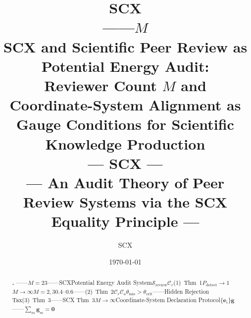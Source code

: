 \documentclass[12pt,a4paper]{article}
\title{
    \textbf{\LARGE SCX\\[6pt]
    ——$M$}\\[14pt]
    \large
    SCX and Scientific Peer Review as Potential Energy Audit:\\
    Reviewer Count $M$ and Coordinate-System Alignment as\\
    Gauge Conditions for Scientific Knowledge Production\\[8pt]
    \normalsize
    --- SCX ---\\
    --- An Audit Theory of Peer Review Systems via the SCX Equality Principle ---
}
\author{SCX}\\[4pt]
\date{\today}
\theoremstyle{remark}
\newcommand{\sumgd}{\sum_m \mathbf{g}_m = \mathbf{0}}
\newcommand{\reviewSurf}{\mathcal{S}_{\text{review}}}
\newcommand{\coordSys}{\mathcal{C}}
\newcommand{\gaugeVec}{\mathbf{g}}
\newcommand{\misalignAngle}{\theta_{\text{mis}}}
\newcommand{\threshCrit}{\theta_{\text{crit}}}
\newcommand{\detectProb}{P_{\text{detect}}}
\begin{document}
\maketitle

\begin{abstract}

\noindent\textbf{.}
——$M=2$$3$——SCX\textbf{}Potential Energy Audit System$\reviewSurf$$\coordSys_r$(1)~\textbf{}Thm~1$\detectProb \to 1$$M \to \infty$$M=2,3$$0.4$--$0.6$——\textbf{}(2)~\textbf{}Thm~2$\coordSys_r$$\coordSys_a$$\misalignAngle > \threshCrit$——\textbf{}Hidden Rejection Tax(3)~\textbf{}Thm~3\textit{}\textit{}——SCX Thm~3$M \to \infty$\textbf{}Coordinate-System Declaration Protocol$\{\mathbf{e}_i\}$$\gaugeVec$——$\sumgd$


\end{abstract}
\end{document}
